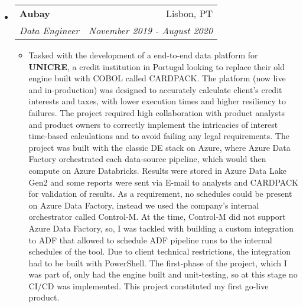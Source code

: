 \documentclass[letterpaper,11pt]{article} \newlength{\outerbordwidth} \pagestyle{empty}
\makeatletter
\newcommand{\resitem}[1]{\item #1 \vspace{-2pt}}
\newcommand{\ressubheading}[4]{
\begin{tabular*}{6.5in}{l@{\cftdotfill{\cftsecdotsep}\extracolsep{\fill}}r}
		\textbf{#1} & #2 \\
		\textit{#3} & \textit{#4} \\
\end{tabular*}\vspace{-6pt}}
\makeatother
\begin{document}
\begin{itemize}
\item
    \ressubheading{Aubay}{Lisbon, PT}{Data Engineer}{November 2019 - August 2020}
	\begin{itemize}
            \resitem{Tasked with the development of a end-to-end data platform for \textbf{UNICRE}, a credit institution in Portugal looking to replace their old engine built with COBOL called CARDPACK. The platform (now live and in-production) was designed to accurately calculate client's credit interests and taxes, with lower execution times and higher resiliency to failures. The project required high collaboration with product analysts and product owners to correctly implement the intricacies of interest time-based calculations and to avoid failing any legal requirements.  The project was built with the classic DE stack on Azure, where Azure Data Factory orchestrated each data-source pipeline, which would then compute on Azure Databricks. Results were stored in Azure Data Lake Gen2 and some reports were sent via E-mail to analysts and CARDPACK for validation of results. As a requirement, no schedules could be present on Azure Data Factory, instead we used the company's internal orchestrator called Control-M. At the time, Control-M did not support Azure Data Factory, so, I was tackled with building a custom integration to ADF that allowed to schedule ADF pipeline runs to the internal schedules of the tool. Due to client technical restrictions, the integration had to be built with PowerShell. The first-phase of the project, which I was part of, only had the engine built and unit-testing, so at this stage no CI/CD was implemented. This project constituted my first go-live product.}
	\end{itemize}


\end{itemize}
\end{document}
